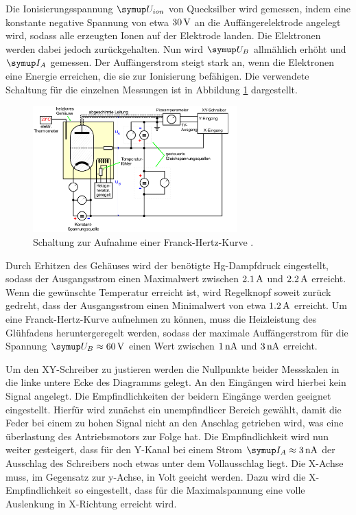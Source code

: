 Die Ionisierungsspannung $\su{U_{ion}}$ von Quecksilber wird gemessen, indem eine
konstante negative Spannung von etwa $30\,\si{\volt}$ an die Auffängerelektrode angelegt
wird, sodass alle erzeugten Ionen auf der Elektrode landen. Die Elektronen werden
dabei jedoch zurückgehalten.
Nun wird $\su{U_B}$ allmählich erhöht und $\su{I_A}$ gemessen. Der Auffängerstrom
steigt stark an, wenn die Elektronen eine Energie erreichen, die sie zur
Ionisierung befähigen.
Die verwendete Schaltung für die einzelnen Messungen ist in Abbildung \ref{fig:schalt}
dargestellt.
\begin{figure}
  \centering
  \includegraphics[width=0.7\textwidth]{bilder/schalt.jpg}
  \caption{Schaltung zur Aufnahme einer Franck-Hertz-Kurve \cite{601}.}
  \label{fig:schalt}
\end{figure}
Durch Erhitzen des Gehäuses wird der benötigte Hg-Dampfdruck eingestellt, sodass
der Ausgangsstrom einen Maximalwert zwischen $2.1\,\si{\ampere}$ und $2.2\,\si{\ampere}$ erreicht.
Wenn die gewünschte Temperatur erreicht ist, wird Regelknopf soweit zurück
gedreht, dass der Ausgangsstrom einen Minimalwert von etwa $1.2\,\si{\ampere}$ erreicht.
Um eine Franck-Hertz-Kurve aufnehmen zu können, muss die Heizleistung des
Glühfadens heruntergeregelt werden, sodass der maximale Auffängerstrom für die
Spannung $\su{U_B}\approx60\Volt$ einen Wert zwischen $1\,\si{\nano\ampere}$ und $3\,\si{\nano\ampere}$ erreicht.

Um den XY-Schreiber zu justieren werden die Nullpunkte beider Messskalen in die
linke untere Ecke des Diagramms gelegt. An den Eingängen wird hierbei kein
Signal angelegt. Die Empfindlichkeiten der beidern Eingänge werden geeignet
eingestellt. Hierfür wird zunächst ein unempfindlicer Bereich gewählt, damit
die Feder bei einem zu hohen Signal nicht an den Anschlag getrieben wird, was
eine überlastung des Antriebsmotors zur Folge hat. Die Empfindlichkeit wird nun
weiter gesteigert, dass für den Y-Kanal bei einem Strom $\su{I_A}\approx3\nA$
der Ausschlag des Schreibers noch etwas unter dem Vollausschlag liegt. Die
X-Achse muss, im Gegensatz zur y-Achse, in Volt geeicht werden. Dazu wird
die X-Empfindlichkeit so eingestellt, dass für die Maximalspannung eine volle
Auslenkung in X-Richtung erreicht wird.
